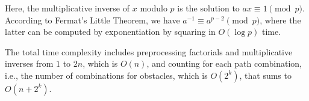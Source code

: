 \documentclass[11pt, a4paper, oneside]{memoir}
\begin{document}
Here, the multiplicative inverse of $x$ modulo $p$ is the solution to $ax \equiv 1 \pmod{p}$.
According to Fermat's Little Theorem, we have $a^{-1} \equiv a^{p-2} \pmod{p}$,
where the latter can be computed by exponentiation by squaring in $O(\log p)$ time.

The total time complexity includes preprocessing factorials and multiplicative inverses from $1$ to $2n$, which is $O(n)$,
and counting for each path combination, i.e., the number of combinations for obstacles, which is $O(2^k)$, that sums to $O(n+2^k)$.

\label{LastPage}
\end{document}
